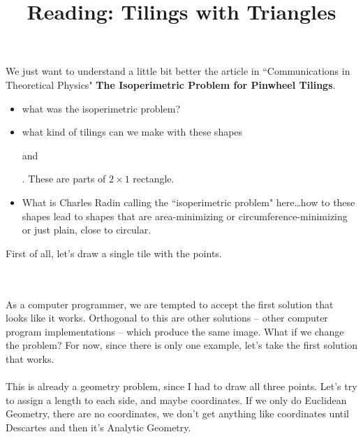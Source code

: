 \documentclass[12pt]{article}
\title{Reading: Tilings with Triangles}
\date{}
\begin{document}
\sffamily

\maketitle

\noindent We just want to understand a little bit better the article in ``Communications in Theoretical Physics" \textbf{The Isoperimetric Problem for Pinwheel Tilings}.   
\begin{itemize}
\item what was the isoperimetric problem?
\item what kind of tilings can we make with these shapes 
 and
 .  These are parts of $2 \times 1$ rectangle.
\item What is Charles Radin calling the ``isoperimetric problem" here\dots how to these shapes lead to shapes that are area-minimizing or circumference-minimizing or just plain, close to circular. 
\end{itemize}
First of all, let's draw a single tile with the points. \\ \\
 \\ 
As a computer programmer, we are tempted to accept the first solution that looks like it works.  Orthogonal to this are other solutions -- other computer program implementations -- which produce the same image.  What if we change the problem?  For now, since there is only one example, let's take the first solution that works. \\ \\
This is already a geometry problem, since I had to draw all three points.  Let's try to assign a length to each side, and maybe coordinates.  If we only do Euclidean Geometry, there are no coordinates, we don't get anything like coordinates until Descartes and then it's Analytic Geometry. \\
\end{document}
